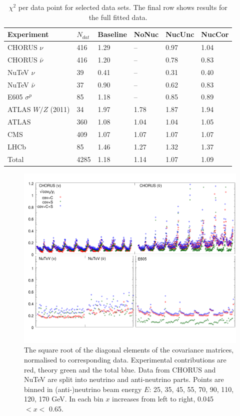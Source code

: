 \begin{table}
\begin{tabular}{l||l|llll}
Experiment            & $N_{dat}$ & Baseline & NoNuc & NucUnc & NucCor \\
\hline
\hline
CHORUS $\nu$           &  416 & 1.29 & -- & 0.97 & 1.04   \\
CHORUS $\bar{\nu}$    &  416 & 1.20  &  -- & 0.78  & 0.83    \\
NuTeV $\nu$  & 39  & 0.41 & -- & 0.31  & 0.40  \\
NuTeV   $\bar{\nu}$ & 37 & 0.90 & -- &  0.62 & 0.83 \\
E605 $\sigma^p$  &  85 & 1.18 & --  & 0.85 & 0.89 \\
ATLAS $W/Z$ (2011) & 34 & 1.97 & 1.78 & 1.87 & 1.94 \\
ATLAS & 360 & 1.08 & 1.04 & 1.04 & 1.05 \\
CMS & 409 & 1.07 & 1.07 & 1.07 & 1.07 \\
LHCb & 85 & 1.46 & 1.27 & 1.32 & 1.37 \\
\hline
Total & 4285 & 1.18  & 1.14  & 1.07  & 1.09      
\end{tabular}
\caption{$\chi^2$ per data point for selected data sets. The final row shows results for the full fitted data.\label{tab:chi2}}
\end{table}
 
\begin{figure}
  \centering
  \includegraphics[width=\textwidth]{nuclear/covimpact1.jpg}
    \caption{The square root of the diagonal elements of the covariance matrices, normalised to corresponding data. Experimental contributions are red, theory green and the total blue. Data from CHORUS and NuTeV are split into neutrino and anti-neutrino parts. Points are binned in (anti-)neutrino beam energy $E$: 25, 35, 45, 55, 70, 90, 110, 120, 170 GeV. In each bin $x$ increases from left to right, 0.045 $< x <$ 0.65.\label{fig:diagcovmat}}
\end{figure}
